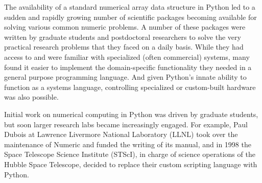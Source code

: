 \documentclass[fleqn,10pt]{wlscirep}
\begin{document}
The availability of a standard numerical array data structure in
Python led to a sudden and rapidly growing number of scientific
packages becoming available for solving various common numeric
problems.
A number of these packages were written by graduate students and
postdoctoral researchers to solve the very practical research problems
that they faced on a daily basis.  While they had access to and were
familiar with specialized (often commercial) systems, many found
it easier to implement the domain-specific functionality they needed
in a general purpose programming language.  And given Python's innate
ability to function as a systems language, controlling specialized or
custom-built hardware was also possible.

Initial work on numerical computing in Python was driven by graduate
students, but soon larger research labs became increasingly engaged.
For example, Paul Dubois at Lawrence Livermore National Laboratory (LLNL) took over the
maintenance of Numeric and funded the writing of its
manual\cite{Numeric-manual}, and
in 1998 the Space Telescope Science Institute (STScI), in charge of science
operations of the Hubble Space Telescope, decided to replace their
custom scripting language with Python\cite{STScI-slither}.


%

\end{document}
